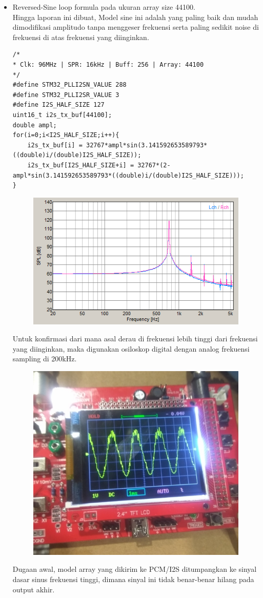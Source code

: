 \documentclass[12pt,]{article}
\begin{document}
\begin{itemize}
\begin{itemize}
			\newpage
			\item Reversed-Sine loop formula pada ukuran array size 44100.\\
			Hingga laporan ini dibuat, Model sine ini adalah yang paling baik 
			dan mudah dimodifikasi amplitudo tanpa menggeser frekuensi
			serta paling sedikit noise di frekuensi di atas frekuensi yang diinginkan. 
			\begin{verbatim}
/*
* Clk: 96MHz | SPR: 16kHz | Buff: 256 | Array: 44100
*/
#define STM32_PLLI2SN_VALUE 288
#define STM32_PLLI2SR_VALUE 3
#define I2S_HALF_SIZE 127	
uint16_t i2s_tx_buf[44100];
double ampl;
for(i=0;i<I2S_HALF_SIZE;i++){
	i2s_tx_buf[i] = 32767*ampl*sin(3.141592653589793*((double)i/(double)I2S_HALF_SIZE));
	i2s_tx_buf[I2S_HALF_SIZE+i] = 32767*(2-ampl*sin(3.141592653589793*((double)i/(double)I2S_HALF_SIZE)));
}
			\end{verbatim}
			\begin{figure}[H]
				\centering
				\includegraphics[width=0.5\linewidth]{result/arr_spr_revsine}
			\end{figure}
		
			Untuk konfirmasi dari mana asal derau di frekuensi lebih tinggi dari frekuensi yang diinginkan,
			maka digunakan osiloskop digital dengan analog frekuensi sampling di 200kHz.
			\begin{figure}[H]
				\centering
				\includegraphics[width=0.5\linewidth]{result/osiloskop}
			\end{figure}
			
			Dugaan awal, model array yang dikirim ke PCM/I2S ditumpangkan ke sinyal dasar sinus frekuensi tinggi,
			dimana sinyal ini tidak benar-benar hilang pada output akhir.
		\end{itemize}
	\end{itemize}
\end{document}
